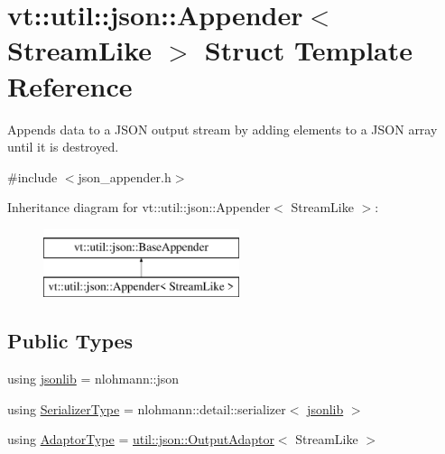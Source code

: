\hypertarget{structvt_1_1util_1_1json_1_1_appender}{}\section{vt\+:\+:util\+:\+:json\+:\+:Appender$<$ Stream\+Like $>$ Struct Template Reference}
\label{structvt_1_1util_1_1json_1_1_appender}


Appends data to a J\+S\+ON output stream by adding elements to a J\+S\+ON array until it is destroyed.  




{\ttfamily \#include $<$json\+\_\+appender.\+h$>$}

Inheritance diagram for vt\+:\+:util\+:\+:json\+:\+:Appender$<$ Stream\+Like $>$\+:\begin{figure}[H]
\begin{center}
\leavevmode
\includegraphics[height=2.000000cm]{structvt_1_1util_1_1json_1_1_appender}
\end{center}
\end{figure}
\subsection*{Public Types}
\begin{DoxyCompactItemize}
\item 
using \hyperlink{structvt_1_1util_1_1json_1_1_appender_aa822e25e24db1cdea96f00b79f55f492}{jsonlib} = nlohmann\+::json
\item 
using \hyperlink{structvt_1_1util_1_1json_1_1_appender_a26808926bcd93d8f2b7d3d6ec279cc95}{Serializer\+Type} = nlohmann\+::detail\+::serializer$<$ \hyperlink{structvt_1_1util_1_1json_1_1_appender_aa822e25e24db1cdea96f00b79f55f492}{jsonlib} $>$
\item 
using \hyperlink{structvt_1_1util_1_1json_1_1_appender_ae7a25e7544d8529cb466651fff13db0b}{Adaptor\+Type} = \hyperlink{structvt_1_1util_1_1json_1_1_output_adaptor}{util\+::json\+::\+Output\+Adaptor}$<$ Stream\+Like $>$
\end{DoxyCompactItemize}
